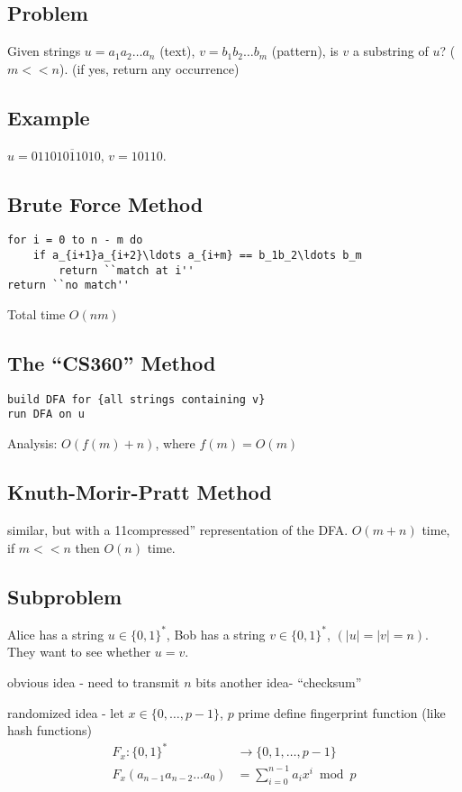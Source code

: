 \documentclass[english,12pt]{article}
\theoremstyle{plain}
\theoremstyle{definition}
\theoremstyle{definition} %
\begin{document}
\subsection{Problem}
Given strings $u=a_1a_2\ldots a_n$ (text), $v=b_1b_2\ldots b_m$ (pattern), is $v$ a substring of $u$?  ($m << n$).  (if yes, return any occurrence)

\subsection{Example}
$u=0110\overline{10110}10$, $v=10110$.

\subsection{Brute Force Method}
\begin{verbatim}
for i = 0 to n - m do
    if a_{i+1}a_{i+2}\ldots a_{i+m} == b_1b_2\ldots b_m
        return ``match at i''
return ``no match''
\end{verbatim}

Total time $O(nm)$

\subsection{The ``CS360'' Method}
\begin{verbatim}
build DFA for {all strings containing v}
run DFA on u
\end{verbatim}

Analysis: $O(f(m)+n)$, where $f(m)=O(m)$

\subsection{Knuth-Morir-Pratt Method}
similar, but with a 11compressed'' representation of the DFA.  $O(m+n)$ time, if $m << n$ then  $O(n)$ time.

\subsection{Subproblem}
Alice has a string $u\in \{0, 1\}^\ast$, Bob has a string $v\in \{0,1\}^\ast$, $(|u|=|v|=n)$.  They want to see whether $u=v$.

obvious idea - need to transmit $n$ bits
another idea- ``checksum''

randomized idea - let $x\in\{0,\ldots, p-1\}$, $p$ prime define fingerprint function (like hash functions)
\begin{align*}
F_x:\{0,1\}^\ast &\rightarrow \{0,1,\ldots, p-1\}\\
F_x(a_{n-1}a_{n-2}\ldots a_0)&=\sum_{i=0}^{n-1} a_ix^i\bmod p
\end{align*}
\end{document}
